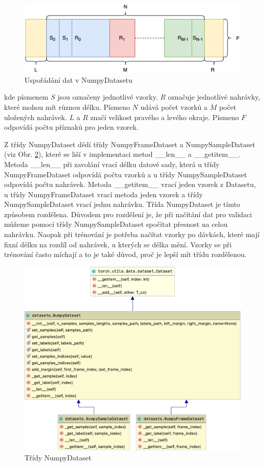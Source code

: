 \documentclass[FM,BP]{tulthesis}
\begin{document}
\begin{figure}[htbp]
\centerline{\includegraphics[scale=.125]{dataset_arrangement.png}}
\caption{Uspořádání dat v NumpyDatasetu}
\label{fig:data_arrangement}
\end{figure}
\FloatBarrier

kde písmenem $ S $ jsou označeny jednotlivé vzorky. $ R $ označuje jednotlivé nahrávky, které mohou mít různou délku. Písmeno $ N $ udává počet vzorků a $ M $ počet uložených nahrávek. $ L $ a $ R $ značí velikost pravého a levého okraje. Písmeno $ F $ odpovídá počtu příznaků pro jeden vzorek.

Z třídy NumpyDataset dědí třídy NumpyFrameDataset a NumpySampleDataset (viz Obr. \ref{fig:numpy_dataset}), které se liší v implementaci metod \_\_len\_\_ a \_\_getitem\_\_. Metoda \_\_len\_\_ při zavolání vrací délku datové sady, která u třídy NumpyFrameDataset odpovídá počtu vzorků a u třídy NumpySampleDataset odpovídá počtu nahrávek. Metoda \_\_getitem\_\_ vrací jeden vzorek z Datasetu, u třídy NumpyFrameDataset vrací metoda jeden vzorek a třídy NumpySampleDataset vrací jednu nahrávku. Třída NumpyDataset je tímto způsobem rozdělena. Důvodem pro rozdělení je, že při načítání dat pro validaci můžeme pomocí třídy NumpySampleDataset spočítat přesnost na celou nahrávku. Naopak při trénování je potřeba načítat vzorky po dávkách, které mají fixní délku na rozdíl od nahrávek, u kterých se délka mění. Vzorky se při trénování často míchají a to je také důvod, proč je lepší mít třídu rozdělenou.

\begin{figure}[h]
\centerline{\includegraphics[scale=.185]{datasets.png}}
\caption{Třídy NumpyDataset}
\label{fig:numpy_dataset}
\end{figure}
\FloatBarrier
\end{document}
